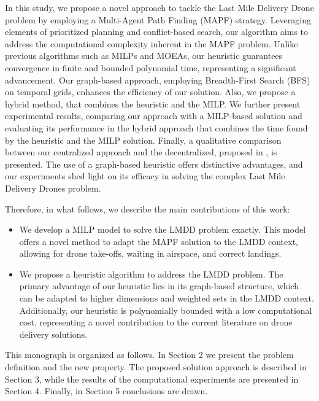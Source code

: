 In this study, we propose a novel approach to tackle the Last Mile Delivery Drone problem by employing a Multi-Agent Path Finding (MAPF) strategy. Leveraging elements of prioritized planning and conflict-based search, our algorithm aims to address the computational complexity inherent in the MAPF problem. Unlike previous algorithms such as MILPs and MOEAs, our heuristic guarantees convergence in finite and bounded polynomial time, representing a significant advancement. Our graph-based approach, employing Breadth-First Search (BFS) on temporal grids, enhances the efficiency of our solution. Also, we propose a hybrid method, that combines the heuristic and the MILP. We further present experimental results, comparing our approach with a MILP-based solution and evaluating its performance in the hybrid approach that combines the time found by the heuristic and the MILP solution. Finally, a qualitative comparison between our centralized approach and the decentralized, proposed in , is presented. The use of a graph-based heuristic offers distinctive advantages, and our experiments shed light on its efficacy in solving the complex Last Mile Delivery Drones problem.

Therefore, in what follows, we describe the main contributions
of this work:
\begin{itemize}
    \item We develop a MILP model to solve the LMDD problem exactly. This model offers a novel method to adapt the MAPF solution to the LMDD context, allowing for drone take-offs, waiting in airspace, and correct landings.
    \item We propose a heuristic algorithm to address the LMDD problem. The primary advantage of our heuristic lies in its graph-based structure, which can be adapted to higher dimensions and weighted sets in the LMDD context. Additionally, our heuristic is polynomially bounded with a low computational cost, representing a novel contribution to the current literature on drone delivery solutions.
\end{itemize}




This monograph is organized as follows. In Section 2 we present the problem definition and the new property. The proposed solution approach is described in Section 3, while the results of the computational experiments are presented in Section 4. Finally, in Section 5 conclusions are drawn.


